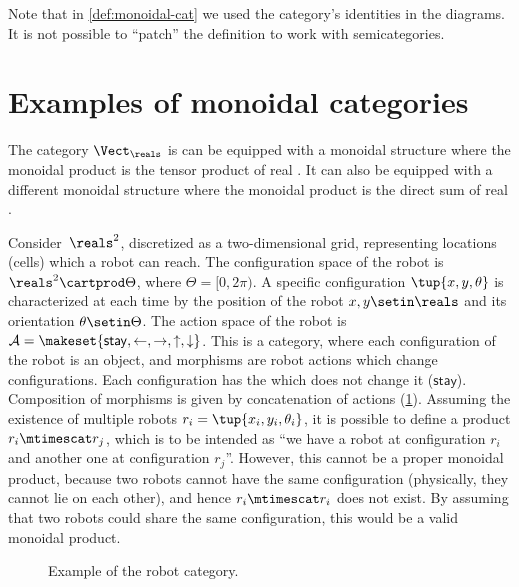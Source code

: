 \begin{remark}
    Note that in \cref{def:monoidal-cat} we used the category's identities in the diagrams.
    It is not possible to ``patch'' the definition to work with semicategories.
\end{remark}

\section{Examples of monoidal categories}



\begin{example}
    \label{ex:Vect-symmetric-monoidal}
    The category $\Vect_\reals$ is can be equipped with a monoidal structure where the monoidal product is the tensor product of real .
    It can also be equipped with a different monoidal structure where the monoidal product is the direct sum of real .
\end{example}

\begin{example}
    \label{ex:robot}
    Consider~$\reals^2$, discretized as a two-dim\-ensional grid, representing locations (cells) which a robot can reach.
    The configuration space of the robot is $\reals^2\cartprod \Theta$, where $\Theta=[0,2\pi)$.
    A specific configuration $\tup{x,y,\theta}$ is characterized at each time by the position of the robot $x,y\setin \reals$ and its orientation $\theta \setin \Theta$.
    The action space of the robot is $\mathcal{A}=\makeset{\mathsf{stay},\leftarrow, \rightarrow, \uparrow, \downarrow}$.
    This is a category, where each configuration of the robot is an object, and morphisms are robot actions which change configurations.
    Each configuration has the  which does not change it ($\mathsf{stay}$).
    Composition of morphisms is given by concatenation of actions (\cref{fig:robotcategory}).
    Assuming the existence of multiple robots $r_i=\tup{x_i,y_i,\theta_i}$, it is possible to define a product $r_i\mtimescat r_j$, which is to be intended as ``we have a robot at configuration $r_i$ and another one at configuration $r_j$''.
    However, this cannot be a proper monoidal product, because two robots cannot have the same configuration (physically, they cannot lie on each other), and hence $r_i\mtimescat r_i$ does not exist.
    By assuming that two robots could share the same configuration, this would be a valid monoidal product.
    \begin{figure}[tbh]
        \centering
        \caption{Example of the robot category. }
        \label{fig:robotcategory}
    \end{figure}
\end{example}

